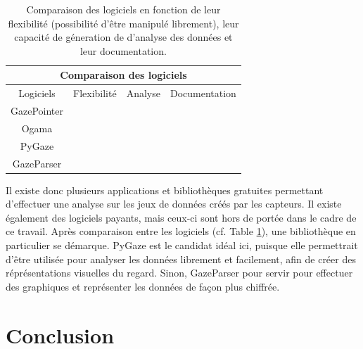 \documentclass[12pt]{article}
\newcommand{\cmark}{\ding{51}}
\newcommand{\xmark}{\ding{55}}
\begin{document}
\bigskip
\begin{table}[htpb]
  \begin{center}
    \begin{tabular}{|c||c|c|c|}
      \hline
      \multicolumn{4}{|c|}{Comparaison des logiciels}             \\
      \hline
      Logiciels   & Flexibilité   & Analyse       & Documentation \\
      \hline
      GazePointer & \xmark        & \cmark        & \cmark        \\
      Ogama       & \xmark        & \cmark \cmark & \cmark        \\
      PyGaze      & \cmark \cmark & \cmark \cmark & \cmark \cmark \\
      GazeParser  & \cmark        & \cmark \cmark & \cmark        \\
      \hline
    \end{tabular}
    \caption{Comparaison des logiciels en fonction de leur flexibilité
      (possibilité d'être manipulé librement), leur capacité de géneration de
      d'analyse des données et leur documentation.}
    \label{tab:comparaison}
  \end{center}
\end{table}

Il existe donc plusieurs applications et bibliothèques gratuites permettant
d'effectuer une analyse sur les jeux de données créés par les capteurs. Il
existe également des logiciels payants, mais ceux-ci sont hors de portée dans le
cadre de ce travail. Après comparaison entre les logiciels (cf. Table
\ref{tab:comparaison}), une bibliothèque en particulier se démarque. PyGaze est
le candidat idéal ici, puisque elle permettrait d'être utilisée pour analyser
les données librement et facilement, afin de créer des réprésentations visuelles
du regard. Sinon, GazeParser pour servir pour effectuer des graphiques et
représenter les données de façon plus chiffrée.


\section{Conclusion}
\end{document}
